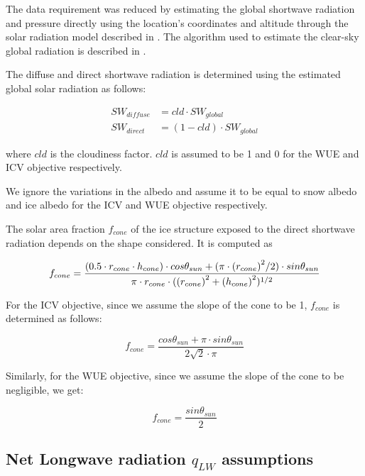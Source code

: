 \documentclass[tc, manuscript]{copernicus}
\begin{document}
The data requirement was reduced by estimating the global shortwave radiation and pressure directly using the
location's coordinates and altitude through the solar radiation model described in
\citet{holmgrenPvlibPythonPython2018}. The algorithm used to estimate the clear-sky global radiation is
described in \citet{ineichenBroadbandSimplifiedVersion2008}.  

The diffuse and direct shortwave radiation is determined using the estimated global solar radiation as follows:

\begin{equation}
\begin{split}
  SW_{diffuse} &= cld \cdot SW_{global}\\
  SW_{direct} &= (1-cld) \cdot SW_{global}
\end{split}
\end{equation}

where $cld$ is the cloudiness factor. $cld$ is assumed to be 1 and 0 for the WUE and ICV objective
respectively.

We ignore the variations in the albedo and assume it to be equal to snow albedo and ice albedo for the ICV and
WUE objective respectively.

The solar area fraction $f_{cone}$ of the ice structure exposed to the direct shortwave radiation depends on the
shape considered. It is computed as

\begin{equation}
		f_{cone} =\frac{(0.5 \cdot r_{cone} \cdot h_{cone}) \cdot cos \theta_{sun} +(\pi \cdot
			{(r_{cone})}^2/2) \cdot sin \theta_{sun} }{\pi \cdot r_{cone} \cdot ({(r_{cone})}^2+{(h_{cone})}^2)^{1/2}}\\
\end{equation}

For the ICV objective, since we assume the slope of the cone to be 1, $f_{cone}$ is determined as follows:

\begin{equation}
		f_{cone} =\frac{ cos \theta_{sun} + \pi \cdot sin \theta_{sun} }{2\sqrt{2} \cdot \pi }
\end{equation}

Similarly, for the WUE objective, since we assume the slope of the cone to be negligible, we get:

\begin{equation}
		f_{cone} =\frac{ sin \theta_{sun} }{2 }
\end{equation}

\subsection{Net Longwave radiation \texorpdfstring{$q_{LW}$}{Lg} assumptions} 
\end{document}
